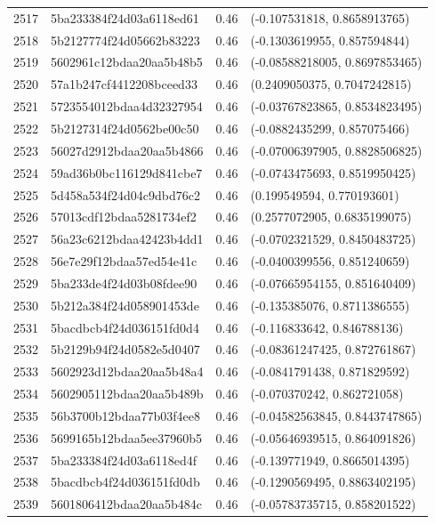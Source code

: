 \begin{table}[ht]
\begin{tabular}{rlrl}
  2517 & 5ba233384f24d03a6118ed61 & 0.46 & (-0.107531818, 0.8658913765) \\ 
  2518 & 5b2127774f24d05662b83223 & 0.46 & (-0.1303619955, 0.857594844) \\ 
  2519 & 5602961c12bdaa20aa5b48b5 & 0.46 & (-0.08588218005, 0.8697853465) \\ 
  2520 & 57a1b247cf4412208bceed33 & 0.46 & (0.2409050375, 0.7047242815) \\ 
  2521 & 5723554012bdaa4d32327954 & 0.46 & (-0.03767823865, 0.8534823495) \\ 
  2522 & 5b2127314f24d0562be00c50 & 0.46 & (-0.0882435299, 0.857075466) \\ 
  2523 & 56027d2912bdaa20aa5b4866 & 0.46 & (-0.07006397905, 0.8828506825) \\ 
  2524 & 59ad36b0bc116129d841cbe7 & 0.46 & (-0.0743475693, 0.8519950425) \\ 
  2525 & 5d458a534f24d04c9dbd76c2 & 0.46 & (0.199549594, 0.770193601) \\ 
  2526 & 57013cdf12bdaa5281734ef2 & 0.46 & (0.2577072905, 0.6835199075) \\ 
  2527 & 56a23c6212bdaa42423b4dd1 & 0.46 & (-0.0702321529, 0.8450483725) \\ 
  2528 & 56e7e29f12bdaa57ed54e41c & 0.46 & (-0.0400399556, 0.851240659) \\ 
  2529 & 5ba233de4f24d03b08fdee90 & 0.46 & (-0.07665954155, 0.851640409) \\ 
  2530 & 5b212a384f24d058901453de & 0.46 & (-0.135385076, 0.8711386555) \\ 
  2531 & 5bacdbcb4f24d036151fd0d4 & 0.46 & (-0.116833642, 0.846788136) \\ 
  2532 & 5b2129b94f24d0582e5d0407 & 0.46 & (-0.08361247425, 0.872761867) \\ 
  2533 & 5602923d12bdaa20aa5b48a4 & 0.46 & (-0.0841791438, 0.871829592) \\ 
  2534 & 5602905112bdaa20aa5b489b & 0.46 & (-0.070370242, 0.862721058) \\ 
  2535 & 56b3700b12bdaa77b03f4ee8 & 0.46 & (-0.04582563845, 0.8443747865) \\ 
  2536 & 5699165b12bdaa5ee37960b5 & 0.46 & (-0.05646939515, 0.864091826) \\ 
  2537 & 5ba233384f24d03a6118ed4f & 0.46 & (-0.139771949, 0.8665014395) \\ 
  2538 & 5bacdbcb4f24d036151fd0db & 0.46 & (-0.1290569495, 0.8863402195) \\ 
  2539 & 5601806412bdaa20aa5b484c & 0.46 & (-0.05783735715, 0.858201522) \\ 

\end{tabular}
\end{table}
